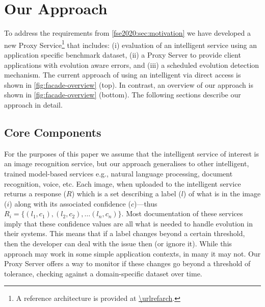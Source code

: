 \section{Our Approach}
\label{fse2020:sec:solution}

To address the requirements from \cref{fse2020:sec:motivation} we have developed a new Proxy Service\footnote{A reference architecture is provided at \url{\urlrefarch}.} that includes: (i) evaluation of an intelligent service using an application specific benchmark dataset, (ii) a Proxy Server to provide client applications with evolution aware errors, and (iii) a scheduled evolution detection mechanism. The current approach of using an intelligent  via direct access is shown in \cref{fig:facade-overview} (top). In contrast, an overview of our approach is shown in \cref{fig:facade-overview} (bottom). The following sections describe our approach in detail. 

\subsection{Core Components}

For the purposes of this paper we assume that the intelligent service of interest is an image recognition service, but our approach generalises to other intelligent, trained model-based services e.g., natural language processing, document recognition, voice, etc. Each image, when uploaded to the intelligent service returns a response ($R$) which is a set describing a label ($l$) of what is in the image ($i$) along with its associated confidence ($c$)---thus $R_{i} = \{ (l_{1}, c_{1}), (l_{2}, c_{2}), \dots (l_{n}, c_{n}) \}$. Most documentation of these services imply that these confidence values are all what is needed to handle evolution in their systems. This means that if a label changes beyond a certain threshold, then the developer can deal with the issue then (or ignore it). While this approach may work in some simple application contexts, in many it may not. Our Proxy Server offers a way to monitor if these changes go beyond a threshold of tolerance, checking against a domain-specific dataset over time.

